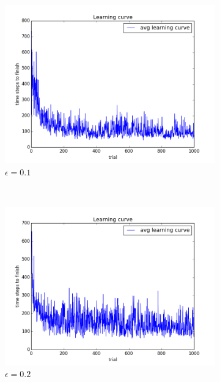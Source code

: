 \begin{figure}[h!]
\begin{subfigure}[b]{0.4\textwidth}
    \includegraphics[width=\textwidth]{figures/epsilon_1_learning_curve.png}
    \caption{$\epsilon = 0.1$}
\end{subfigure}
~
\begin{subfigure}[b]{0.4\textwidth}
    \includegraphics[width=\textwidth]{figures/epsilon_2_learning_curve.png}
    \caption{$\epsilon = 0.2$}
\end{subfigure}
\begin{subfigure}[b]{0.4\textwidth}

\end{subfigure}
\end{figure}
